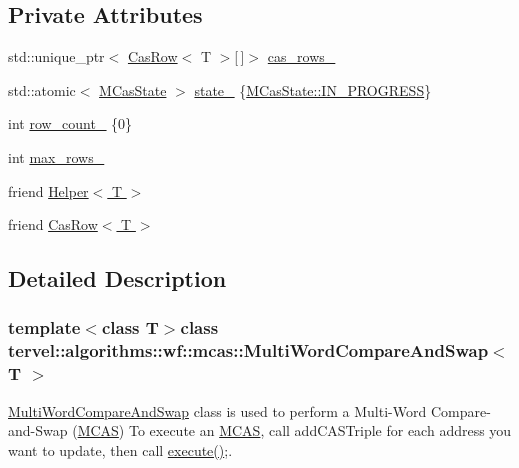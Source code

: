 \subsection*{Private Attributes}
\begin{DoxyCompactItemize}
\item 
std\+::unique\+\_\+ptr$<$ \hyperlink{classtervel_1_1algorithms_1_1wf_1_1mcas_1_1_cas_row}{Cas\+Row}$<$ T $>$\mbox{[}$\,$\mbox{]}$>$ \hyperlink{classtervel_1_1algorithms_1_1wf_1_1mcas_1_1_multi_word_compare_and_swap_aa8be0b396445ce9d7e022aaab4acbaff}{cas\+\_\+rows\+\_\+}
\item 
std\+::atomic$<$ \hyperlink{classtervel_1_1algorithms_1_1wf_1_1mcas_1_1_multi_word_compare_and_swap_acc59b33256be2492c2d576bd1b770027}{M\+Cas\+State} $>$ \hyperlink{classtervel_1_1algorithms_1_1wf_1_1mcas_1_1_multi_word_compare_and_swap_a4d1104bb3f8bd1f0c2f4f93366c08224}{state\+\_\+} \{\hyperlink{classtervel_1_1algorithms_1_1wf_1_1mcas_1_1_multi_word_compare_and_swap_acc59b33256be2492c2d576bd1b770027aca69f96c768067fbff6c911ca87bccc9}{M\+Cas\+State\+::\+I\+N\+\_\+\+P\+R\+O\+G\+R\+E\+S\+S}\}
\item 
int \hyperlink{classtervel_1_1algorithms_1_1wf_1_1mcas_1_1_multi_word_compare_and_swap_a7e5a630e068ea866a43d4ad17fe71b98}{row\+\_\+count\+\_\+} \{0\}
\item 
int \hyperlink{classtervel_1_1algorithms_1_1wf_1_1mcas_1_1_multi_word_compare_and_swap_a9a61156a897ca69db4ef4b14a3949b5f}{max\+\_\+rows\+\_\+}
\item 
friend \hyperlink{classtervel_1_1algorithms_1_1wf_1_1mcas_1_1_multi_word_compare_and_swap_afdcffdc9d34879f8028a39d91def8fb7}{Helper$<$ T $>$}
\item 
friend \hyperlink{classtervel_1_1algorithms_1_1wf_1_1mcas_1_1_multi_word_compare_and_swap_a330cbacbf84e4c22631cc35b28b0bed4}{Cas\+Row$<$ T $>$}
\end{DoxyCompactItemize}


\subsection{Detailed Description}
\subsubsection*{template$<$class T$>$class tervel\+::algorithms\+::wf\+::mcas\+::\+Multi\+Word\+Compare\+And\+Swap$<$ T $>$}

\hyperlink{classtervel_1_1algorithms_1_1wf_1_1mcas_1_1_multi_word_compare_and_swap}{Multi\+Word\+Compare\+And\+Swap} class is used to perform a Multi-\/\+Word Compare-\/and-\/\+Swap (\hyperlink{classtervel_1_1algorithms_1_1wf_1_1mcas_1_1_m_c_a_s}{M\+C\+A\+S}) To execute an \hyperlink{classtervel_1_1algorithms_1_1wf_1_1mcas_1_1_m_c_a_s}{M\+C\+A\+S}, call add\+C\+A\+S\+Triple for each address you want to update, then call \hyperlink{classtervel_1_1algorithms_1_1wf_1_1mcas_1_1_multi_word_compare_and_swap_a3cf56f32c7579f734b1e0ecbd8d9c7f3}{execute()};. 

